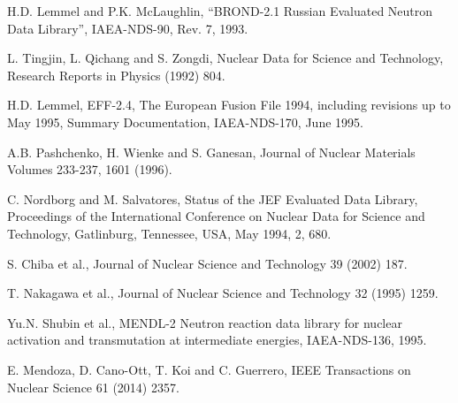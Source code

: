  H.D. Lemmel and P.K. McLaughlin, ``BROND-2.1 Russian Evaluated
                       Neutron Data Library'', IAEA-NDS-90, Rev. 7, 1993.

 L. Tingjin, L. Qichang and S. Zongdi, 
                       Nuclear Data for Science and Technology, 
                       Research Reports in Physics (1992) 804.

 H.D. Lemmel, EFF-2.4, The European Fusion File 1994,
                     including revisions up to May 1995, 
                     Summary Documentation, IAEA-NDS-170, June 1995.

 A.B. Pashchenko, H. Wienke and S. Ganesan,
                        Journal of Nuclear Materials Volumes 233-237, 1601 (1996).

 C. Nordborg and M. Salvatores,
                     Status of the JEF Evaluated Data Library,
                     Proceedings of the International Conference on Nuclear Data for
                     Science and Technology, Gatlinburg, Tennessee, USA, May 1994, 
                     2, 680. 

 S. Chiba et al.,
                        Journal of Nuclear Science and Technology 39 (2002) 187.

 T. Nakagawa et al., 
                        Journal of Nuclear Science and Technology 32 (1995) 1259.

 Yu.N. Shubin et al., MENDL-2 Neutron reaction data library 
                       for nuclear activation and transmutation at intermediate 
                       energies, IAEA-NDS-136, 1995. 

 E. Mendoza, D. Cano-Ott, T. Koi and C. Guerrero,
                         IEEE Transactions on Nuclear Science 61 (2014) 2357.

